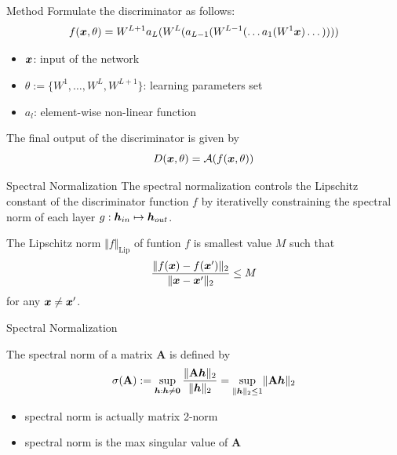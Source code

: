 \documentclass[xcolor={svgnames}]{beamer}
\begin{document}
\begin{frame}{Method}
  Formulate the discriminator as follows:
  $$
  f(\boldsymbol{x}, \theta) = W^{L+1}
                 a_L(W^L(
                     a_{L-1}(W^{L-1}
                 (\dots a_1(W^1 \boldsymbol{x}) \dots))))
  $$ 
  \vspace{-15pt}
  \begin{itemize}
    \item $\boldsymbol{x}$: input of the network
    \item $\theta := \{W^1, \dots, W^L, W^{L+1}\}$: learning parameters set
    \item $a_l$: element-wise non-linear function
  \end{itemize}
  \pause
  The final output of the discriminator is given by
  \[
    D(\boldsymbol{x}, \theta) = \mathcal{A}(f(\boldsymbol{x}, \theta))
  \]
\end{frame}
\begin{frame}{Spectral Normalization}
  The spectral normalization controls the Lipschitz constant of the
  discriminator function $f$ by iterativelly constraining the spectral norm
  of each layer $g: \boldsymbol{h}_{in} \mapsto \boldsymbol{h}_{out}$.
  \begin{definition}
    The Lipschitz norm $\Vert f \Vert_{\mathrm{Lip}}$ of funtion
    $f$ is smallest  value $M$ such that
    \[
      \frac{\Vert f(\boldsymbol{x}) - f(\boldsymbol{x}') \Vert_2}
      {\Vert \boldsymbol{x} - \boldsymbol{x}'\Vert_2} \le M
    \]
    for any $\boldsymbol{x} \neq \boldsymbol{x}'$.
    \label{def: lip-norm}
  \end{definition}
\end{frame}
\begin{frame}{Spectral Normalization}
  \begin{definition}
    The spectral norm of a matrix $\mathbf{A}$ is defined by
    \[
      \sigma(\mathbf{A}):= \sup_{\boldsymbol{h}:\boldsymbol{h} \neq \mathbf 0}
      \frac{\Vert \mathbf{A}\boldsymbol{h} \Vert_2}{\Vert \boldsymbol{h} \Vert_2}
      = \sup_{ \lVert \boldsymbol{h} \rVert_2 \le 1} \lVert \mathbf{A}\boldsymbol{h} \rVert_2
    \]
    \label{def:spectral-norm}
  \end{definition}
  \begin{itemize}
    \item spectral norm is actually matrix 2-norm
    \item spectral norm is the max singular value of $\mathbf{A}$
  \end{itemize}
\end{frame}
\end{document}
